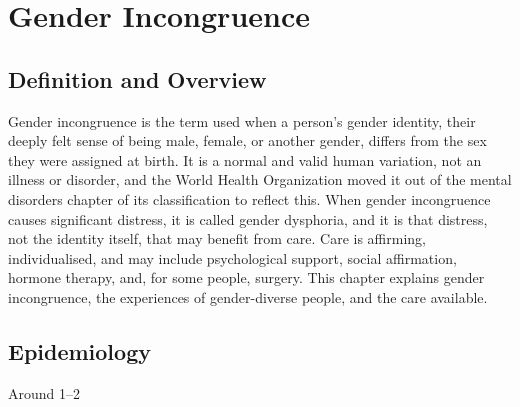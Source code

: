 \chapter{Gender Incongruence}

\section*{Definition and Overview}
Gender incongruence is the term used when a person's gender identity, their deeply felt sense of being male, female, or another gender, differs from the sex they were assigned at birth. It is a normal and valid human variation, not an illness or disorder, and the World Health Organization moved it out of the mental disorders chapter of its classification to reflect this. When gender incongruence causes significant distress, it is called gender dysphoria, and it is that distress, not the identity itself, that may benefit from care. Care is affirming, individualised, and may include psychological support, social affirmation, hormone therapy, and, for some people, surgery. This chapter explains gender incongruence, the experiences of gender-diverse people, and the care available.

\section*{Epidemiology}
Around 1--2%

